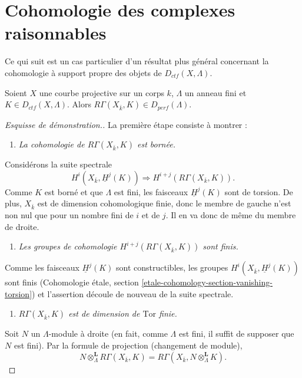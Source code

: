 \section{Cohomologie des complexes raisonnables}
\label{section-cohomology-ctf}

\noindent
Ce qui suit est un cas particulier d'un résultat plus général concernant la
cohomologie à support propre des objets de $D_{ctf}(X, \Lambda)$.

\begin{proposition}
\label{proposition-projective-curve-constructible-cohomology}
Soient $X$ une courbe projective sur un corps $k$, $\Lambda$ un anneau fini et
$K\in D_{ctf}(X, \Lambda)$. Alors $R\Gamma(X_{\bar k}, K)\in
D_{perf}(\Lambda)$.
\end{proposition}

\begin{proof}[Esquisse de démonstration.]
La première étape consiste à montrer :
\begin{enumerate}
\item[(1)]
{\it La cohomologie de $R\Gamma(X_{\bar k}, K)$ est bornée.}
\end{enumerate}
Considérons la suite spectrale
$$
H^i(X_{\bar k}, \underline H^j(K))
\Rightarrow
H^{i+j} (R\Gamma(X_{\bar k}, K)).
$$
Comme $K$ est borné et que $\Lambda$ est fini, les faisceaux $\underline H^j(K)$
sont de torsion. De plus, $X_{\bar k}$ est de dimension cohomologique finie, donc le
membre de gauche n'est non nul que pour un nombre fini de $i$ et de $j$. Il en va donc
de même du membre de droite.
\begin{enumerate}
\item[(2)]
{\it Les groupes de cohomologie $H^{i+j} (R\Gamma(X_{\bar k}, K))$ sont finis.}
\end{enumerate}
Comme les faisceaux $\underline H^j(K)$ sont constructibles, les groupes
$H^i(X_{\bar k}, \underline H^j(K))$ sont finis
(Cohomologie \'etale, section \ref{etale-cohomology-section-vanishing-torsion})
et l'assertion découle de nouveau de la suite spectrale.
\begin{enumerate}
\item[(3)]
{\it $R\Gamma(X_{\bar k}, K)$ est de dimension de $\text{Tor}$ finie.}
\end{enumerate}
Soit $N$ un $\Lambda$-module à droite (en fait, comme $\Lambda$ est fini, il
suffit de supposer que $N$ est fini). Par la formule de projection (changement de
module),
$$
N \otimes^\mathbf{L}_\Lambda R \Gamma(X_{\bar k}, K) = R\Gamma(X_{\bar k},
N \otimes^\mathbf{L}_\Lambda K).
$$
\end{proof}
